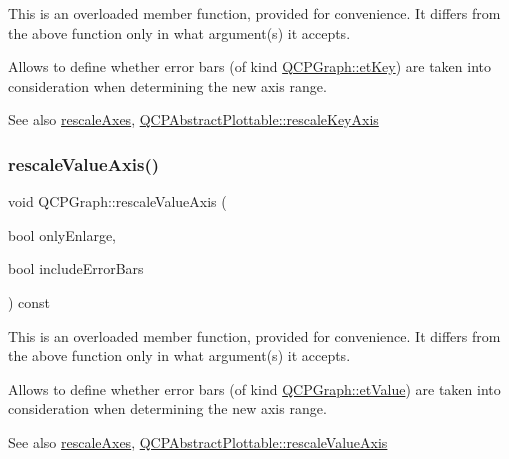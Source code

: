 This is an overloaded member function, provided for convenience. It differs from the above function only in what argument(s) it accepts.

Allows to define whether error bars (of kind \hyperlink{class_q_c_p_graph_ad23b514404bd2cb3216f57c90904d6afa2a5d89cd76fb8b6b18d71b8f6f6c0f43}{Q\+C\+P\+Graph\+::et\+Key}) are taken into consideration when determining the new axis range.

\begin{DoxySeeAlso}{See also}
\hyperlink{class_q_c_p_graph_a9c3909d6116e9d03978f057d41174e6a}{rescale\+Axes}, \hyperlink{class_q_c_p_abstract_plottable_ae96b83c961e257da116c6acf9c7da308}{Q\+C\+P\+Abstract\+Plottable\+::rescale\+Key\+Axis} 
\end{DoxySeeAlso}
\hypertarget{class_q_c_p_graph_a9e0e620a56932c4df80a3762c2f93608}{}\label{class_q_c_p_graph_a9e0e620a56932c4df80a3762c2f93608} 
\subsubsection{\texorpdfstring{rescale\+Value\+Axis()}{rescaleValueAxis()}}
{\footnotesize\ttfamily void Q\+C\+P\+Graph\+::rescale\+Value\+Axis (\begin{DoxyParamCaption}\item[{bool}]{only\+Enlarge,  }\item[{bool}]{include\+Error\+Bars }\end{DoxyParamCaption}) const}

This is an overloaded member function, provided for convenience. It differs from the above function only in what argument(s) it accepts.

Allows to define whether error bars (of kind \hyperlink{class_q_c_p_graph_ad23b514404bd2cb3216f57c90904d6afa147022ccdc49f6bd48f904cb4f61872e}{Q\+C\+P\+Graph\+::et\+Value}) are taken into consideration when determining the new axis range.

\begin{DoxySeeAlso}{See also}
\hyperlink{class_q_c_p_graph_a9c3909d6116e9d03978f057d41174e6a}{rescale\+Axes}, \hyperlink{class_q_c_p_abstract_plottable_aa1e408bb2d13999150c3f7f8a8579ca9}{Q\+C\+P\+Abstract\+Plottable\+::rescale\+Value\+Axis} 
\end{DoxySeeAlso}
\hypertarget{class_q_c_p_graph_a36011c34aca4f7a477de25961e2f6c13}{}\label{class_q_c_p_graph_a36011c34aca4f7a477de25961e2f6c13} 
